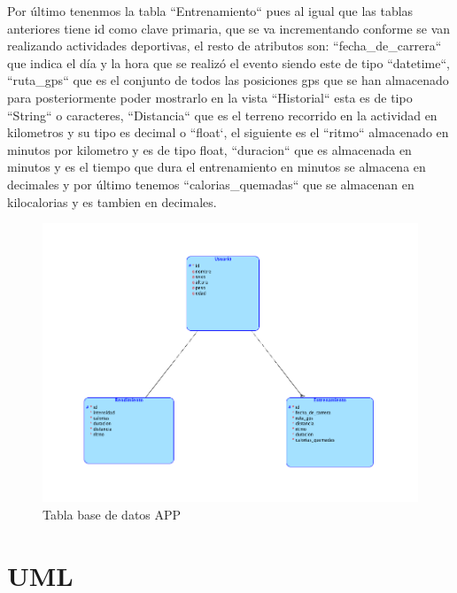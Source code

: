 \documentclass[a4paper, 11pt]{article}
\begin{document}
\begin{itemize}
    Por último tenenmos la tabla ``Entrenamiento`` pues al igual que las tablas anteriores tiene id como
    clave primaria, que se va incrementando conforme se van realizando actividades deportivas, el resto
    de atributos son: ``fecha\_de\_carrera`` que indica el día y la hora que se realizó el evento siendo este
    de tipo ``datetime``, ``ruta\_gps`` que es el conjunto de todos las posiciones gps que se han almacenado
    para posteriormente poder mostrarlo en la vista ``Historial`` esta es de tipo ``String`` o caracteres,
    ``Distancia`` que es el terreno recorrido en la actividad en kilometros y su tipo es decimal o ``float`,
    el siguiente es el ``ritmo`` almacenado en minutos por kilometro y es de tipo float, ``duracion`` que
    es almacenada en minutos y es el tiempo que dura el entrenamiento en minutos se almacena en decimales y
    por último tenemos ``calorias\_quemadas`` que se almacenan en kilocalorias y es tambien en decimales.\\



        \begin{figure}[H]
         \centering
         \includegraphics[width=1\textwidth]{BD}
         \caption{Tabla base de datos APP}
         \label{f:bd}
        \end{figure}

\section{UML}



\end{itemize}
\end{document}
